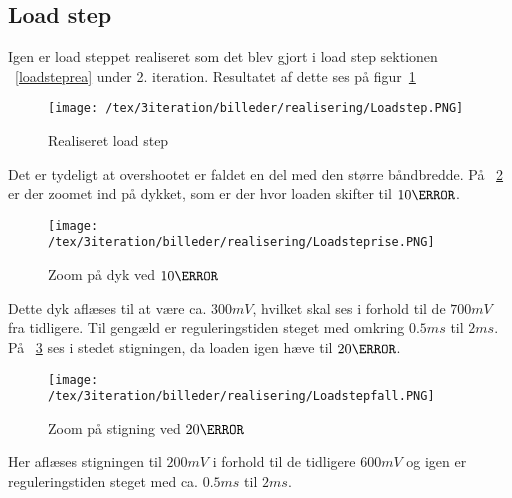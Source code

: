 \subsection{Load step}
Igen er load steppet realiseret som det blev gjort i load step sektionen ~\ref{loadsteprea} under 2. iteration. Resultatet af dette ses på figur~\ref{fig:Loadstep3}
\begin{figure}[H]
	\center
	\texttt{[image: /tex/3iteration/billeder/realisering/Loadstep.PNG]}
	\caption{Realiseret load step}
	\label{fig:Loadstep3}
\end{figure} 
\noindent Det er tydeligt at overshootet er faldet en del med den større båndbredde. På ~\ref{fig:Loadsteprise} er der zoomet ind på dykket, som er der hvor loaden skifter til $10\ohm$.
\begin{figure}[H]
	\center
	\texttt{[image: /tex/3iteration/billeder/realisering/Loadsteprise.PNG]}
	\caption{Zoom på dyk ved $10\ohm$}
	\label{fig:Loadsteprise}
\end{figure}

\noindent Dette dyk aflæses til at være ca. $300mV$, hvilket skal ses i forhold til de $700mV$ fra tidligere. Til gengæld er reguleringstiden steget med omkring $0.5ms$ til $2ms$. På ~\ref{fig:Loadstepfall} ses i stedet stigningen, da loaden igen hæve til $20\ohm$.
\begin{figure}[H]
	\center
	\texttt{[image: /tex/3iteration/billeder/realisering/Loadstepfall.PNG]}
	\caption{Zoom på stigning ved $20\ohm$}
	\label{fig:Loadstepfall}
\end{figure}

\noindent Her aflæses stigningen til $200mV$ i forhold til de tidligere $600mV$ og igen er reguleringstiden steget med ca. $0.5ms$ til $2ms$. 